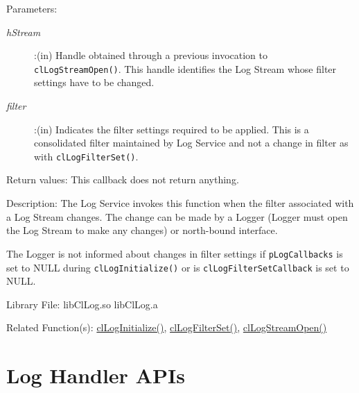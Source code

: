 \begin{flushleft}
\begin{Desc}
\begin{verbatim}
\end{verbatim}
\normalsize
\end{Desc}
\begin{Desc}
\item[Parameters:] \begin{description}
\item[{\em hStream}]:(in) Handle obtained through a previous invocation to {\tt{clLogStreamOpen()}}. This handle identifies the Log Stream whose filter 
settings have to be changed.
\item[{\em filter}]:(in) Indicates the filter settings required to be applied. This is a consolidated filter maintained by Log Service and not 
a change in filter as with {\tt{clLogFilterSet()}}.
\end{description}
\end{Desc}
\begin{Desc}
\item[Return values:]
This callback does not return anything.
\end{Desc}
\begin{Desc}
\item[Description:] The Log Service invokes this function when the filter associated with a Log Stream changes. The change can be made by a
Logger (Logger must open the Log Stream to make any changes) or north-bound interface. 
\par
The Logger is not informed about changes in filter settings if 
{\tt{pLogCallbacks}} is set to NULL during {\tt{clLogInitialize()}} 
or is {\tt{clLogFilterSetCallback}} is set to NULL. 
\end{Desc}
\begin{Desc}
\item[Library File:] libClLog.so
\newline
libClLog.a
\end{Desc}
\begin{Desc}
\item[Related Function(s):]\hyperlink{pagelog101}{clLogInitialize()}, \hyperlink{pagelog111}{clLogFilterSet()},
\hyperlink{pagelog106}{clLogStreamOpen()}
\end{Desc}
\newpage



\section{Log Handler APIs}

\end{flushleft}
